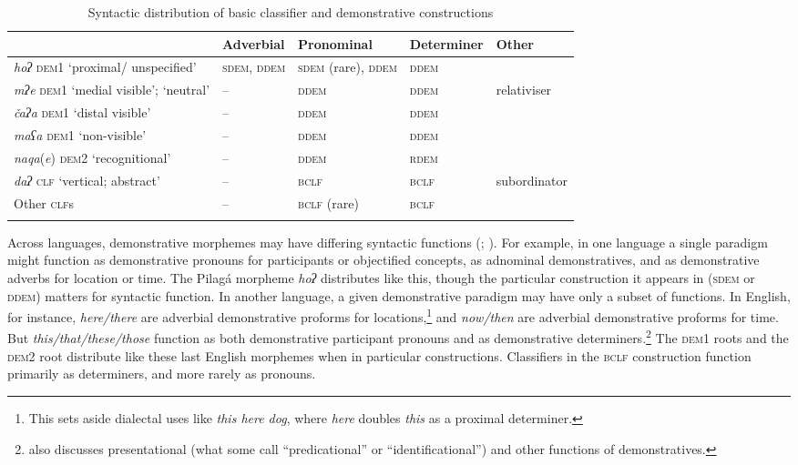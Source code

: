 \documentclass[output=paper,colorlinks,citecolor=brown]{langscibook}
\begin{document}
\begin{table}
\begin{tabularx}{\textwidth}{Qllll}
\lsptoprule
& {\bfseries Adverbial} & {\bfseries Pronominal} & {\bfseries Determiner} & {\bfseries Other}\\
\midrule 
\textit{hoʔ} \textsc{dem1} ‘proximal/ unspecified’ & \textsc{sdem}, \textsc{ddem} & \textsc{sdem} (rare), \textsc{ddem} & \textsc{ddem} & \\
\tablevspace
\textit{mʔe} \textsc{dem1} ‘medial visible’; ‘neutral’ & \textsc{–} & \textsc{ddem} & \textsc{ddem} & relativiser\\
\tablevspace
\textit{čaʔa} \textsc{dem1} ‘distal visible’ & \textsc{–} & \textsc{ddem} & \textsc{ddem} & \\
\tablevspace
\textit{maʕa} \textsc{dem1} ‘non-visible’ & \textsc{–} & \textsc{ddem} & \textsc{ddem}   & \\
\tablevspace
\textit{naqa}(\textit{e}) \textsc{dem2} ‘recognitional’ & \textsc{–} & \textsc{ddem} & \textsc{rdem} & \\
\tablevspace
\textit{daʔ} \textsc{clf} ‘vertical; abstract’ & \textsc{–} & \textsc{bclf} & \textsc{bclf} & subordinator\\
Other \textsc{clf}s & \textsc{–} & \textsc{bclf} (rare) & \textsc{bclf} & \\
\lspbottomrule
\end{tabularx}
\caption{Syntactic distribution of basic classifier and demonstrative constructions}
\label{tab:payne:4}
\end{table}

Across languages, demonstrative morphemes may have differing syntactic functions (\citealt[4]{Diessel1999Book}; \citealt{Krasnoukhova2012}). For example, in one language a single paradigm might function as demonstrative pronouns for participants or objectified concepts, as adnominal demonstratives, and as demonstrative adverbs for location or time. The Pilagá morpheme \textit{hoʔ} distributes like this, though the particular construction it appears in (\textsc{sdem} or \textsc{ddem}) matters for syntactic function. In another language, a given demonstrative paradigm may have only a subset of functions. In English, for instance, \textit{here/there} are adverbial demonstrative proforms for locations,\footnote{This sets aside dialectal uses like \textit{this here dog}, where \textit{here} doubles \textit{this} as a proximal determiner.} and \textit{now/then} are adverbial demonstrative proforms for time. But \textit{this/that/these/those} function as both demonstrative participant pronouns and as demonstrative determiners.\footnote{\citet[90]{Diessel1999Book} also discusses presentational (what some call “predicational” or “identificational”) and other functions of demonstratives.} The \textsc{dem1} roots and the \textsc{dem2} root distribute like these last English morphemes when in particular constructions. Classifiers in the \textsc{bclf} construction function primarily as determiners, and more rarely as pronouns.
\end{document}
